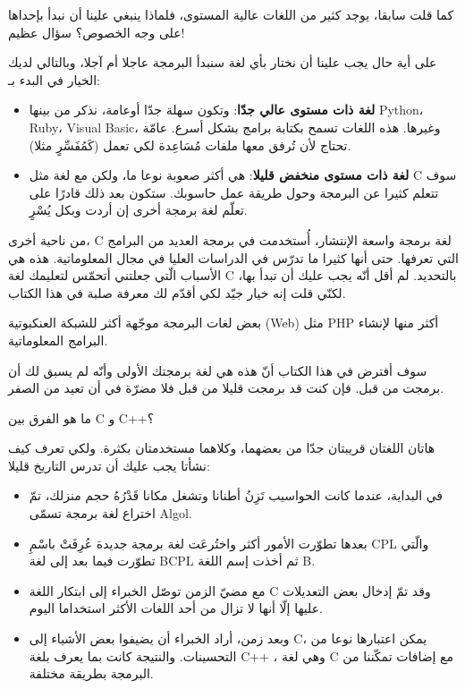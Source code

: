  كما قلت سابقا، يوجد كثير من اللغات عالية المستوى، فلماذا ينبغي علينا أن نبدأ بإحداها على وجه الخصوص؟ سؤال عظيم!

على أية حال يجب علينا أن نختار بأي لغة سنبدأ البرمجة عاجلا أم آجلا، وبالتالي لديك الخيار في البدء بـ:

\begin{itemize}
  \item \textbf{لغة ذات مستوى عالي جدّا}:
 وتكون سهلة جدّا أوعامة، نذكر من بينها
 \textenglish{Python}، \textenglish{Ruby}، \textenglish{Visual Basic}،
 وغيرها. هذه اللغات تسمح بكتابة برامج بشكل أسرع. عامّة تحتاج لأن تُرفق معها ملفات مُسَاعِدة لكي تعمل (كَمُفَسِّرٍ مثلا).
  \item \textbf{لغة ذات مستوى منخفض قليلا}:
هي أكثر صعوبة نوعا ما، ولكن مع لغة مثل
\textenglish{C}
 سوف تتعلم كثيرا عن البرمجة وحول طريقة عمل حاسوبك. ستكون بعد ذلك قادرًا على تعلّم لغة برمجة أخرى إن أردت وبكل يُسْرٍ.
\end{itemize}

من ناحية أخرى،
\textenglish{C}
لغة برمجة واسعة الإنتشار، أُستخدمت في برمجة العديد من البرامج التي تعرفها. حتى أنها كثيرا ما تدرّس في الدراسات العليا في مجال المعلوماتية.
هذه هي الأسباب الّتي جعلتني أتحمّس لتعليمك لغة
\textenglish{C}
بالتحديد. لم أقل أنّه يجب عليك أن تبدأ بها، لكنّي قلت إنه خيار جيّد لكي أقدّم لك معرفة صلبة في هذا الكتاب.

\begin{information}
  بعض لغات البرمجة موجّهة أكثر للشبكة العنكبوتية
 (\textenglish{Web})
 مثل
 \textenglish{PHP}
 أكثر منها لإنشاء البرامج المعلوماتية.
\end{information}

سوف أفترض في هذا الكتاب أنّ هذه هي لغة برمجتك الأولى وأنّه لم يسبق لك أن برمجت من قبل. فإن كنت قد برمجت قليلا من قبل فلا مضرّة في أن تعيد من الصفر.

\begin{question}
  ما هو الفرق بين
  \textenglish{C}
  و
  \textenglish{C++}؟
\end{question}

هاتان اللغتان قريبتان جدّا من بعضهما، وكلاهما مستخدمتان بكثرة. ولكي تعرف كيف نشأتا يجب عليك أن تدرس التاريخ قليلا:
\begin{itemize}
  \item في البداية، عندما كانت الحواسيب تَزِنُ أطنانا وتشغل مكانا قَدْرُهُ حجم منزلك، تمّ اختراع لغة برمجة تسمّى
\textenglish{Algol}.
  \item بعدها تطوّرت الأمور أكثر واختُرعَت لغة برمجة جديدة عُرِفَتْ باسْمِ
\textenglish{CPL}
 والّتي تطوّرت فيما بعد إلى لغة
\textenglish{BCPL}
 ثم أخذت إسم اللغة
\textenglish{B}.
  \item مع مضيّ الزمن توصّل الخبراء إلى ابتكار اللغة
\textenglish{C}
 وقد تمّ إدخال بعض التعديلات عليها إلّا أنها لا تزال من أحد اللغات الأكثر استخداما اليوم.
  \item وبعد زمن، أراد الخبراء أن يضيفوا بعض الأشياء إلى
\textenglish{C}،
يمكن اعتبارها نوعا من التحسينات. والنتيجة كانت بما يعرف بلغة
\textenglish{C++}
، وهي لغة
\textenglish{C}
 مع إضافات تمكّننا من البرمجة بطريقة مختلفة.
\end{itemize}

